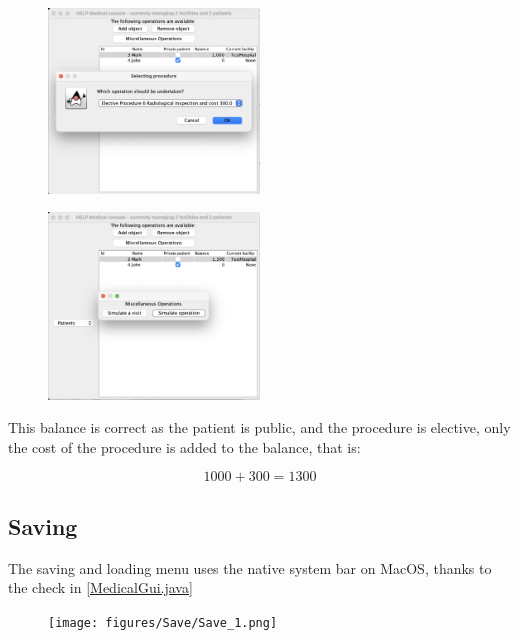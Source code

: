 \documentclass{article}
\begin{document}
\begin{figure}
  \begin{center}
    \includegraphics[width=0.5\textwidth]{./figures/Operation/Operation_6.png}
  \end{center}
\end{figure}

\begin{figure}
  \begin{center}
    \includegraphics[width=0.5\textwidth]{./figures/Operation/Operation_7.png}
  \end{center}
\end{figure}

This balance is correct as the patient is public, and the procedure is elective, only the cost of the procedure is added to the balance, that is: 

\[
  1000 + 300 = 1300
\]

\subsection{Saving}\label{sub:saving} %
The saving and loading menu uses the native system bar on MacOS, thanks to the check in \ref{MedicalGui.java}\cite{macos_titlebar}
\begin{figure}[ht]
  \begin{center}
    \texttt{[image: figures/Save/Save\_1.png]}
  \end{center}
\end{figure}
\end{document}
